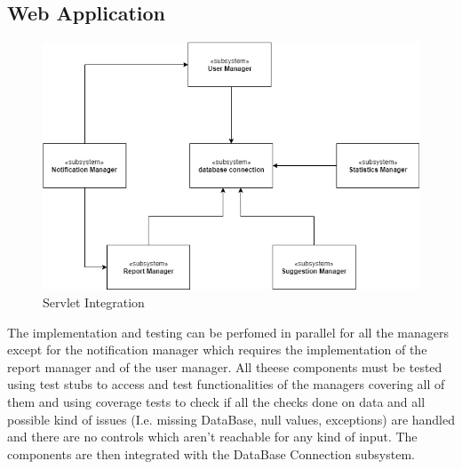 \subsection{Web Application}
\begin{figure}[H]
\centering
\includegraphics[width=\textwidth]{Images/TestServlet.png}
\caption{\label{fig:ComWI}Servlet Integration}
\end{figure}
The implementation and testing can be perfomed in parallel for all the managers except for the notification manager which requires the implementation of the report manager and of the user manager. All theese components must be tested using test stubs to access and test functionalities of the managers covering all of them and using coverage tests to check if all the checks done on data and all possible kind of issues (I.e. missing DataBase, null values, exceptions) are handled and there are no controls which aren't reachable for any kind of input.
The components are then integrated with the DataBase Connection subsystem.
